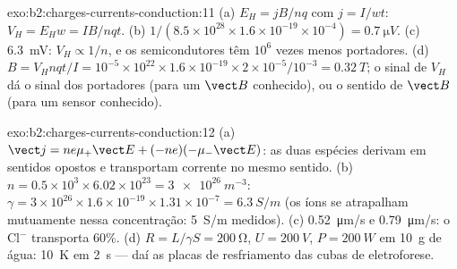 \begin{solution}{exo:b2:charges-currents-conduction:11}
(a) $E_H = jB/nq$ com $j = I/wt$: $V_H = E_Hw = IB/nqt$. (b) $1/(8.5 \times 10^{28}
\times 1.6 \times 10^{-19} \times 10^{-4}) = \qty{0.7}{\micro V}$. (c) \qty{6.3}{mV}: $V_H \propto 1/n$,
e os semicondutores têm $10^6$ vezes menos portadores. (d) $B = V_Hnqt/I =
10^{-5} \times 10^{22} \times 1.6 \times 10^{-19} \times 2 \times 10^{-5}/10^{-3} = \qty{0.32}{T}$; o sinal
de $V_H$ dá o sinal dos portadores (para um $\vect B$ conhecido), ou o
sentido de $\vect B$ (para um sensor conhecido).
\end{solution}

\begin{solution}{exo:b2:charges-currents-conduction:12}
(a) $\vect j = ne\mu_+\vect E + (-ne)(-\mu_-\vect E)$: as duas espécies derivam em
sentidos opostos e transportam corrente no mesmo sentido. (b) $n =
0.5 \times 10^3 \times 6.02 \times 10^{23} = \qty{3e26}{m^{-3}}$: $\gamma = 3 \times 10^{26} \times 1.6 \times 10^{-19}
\times 1.31 \times 10^{-7} = \qty{6.3}{S/m}$ (os íons se atrapalham mutuamente nessa
concentração: \qty{5}{S/m} medidos). (c) \qty{0.52}{\micro m/s} e \qty{0.79}{\micro m/s}:
o Cl$^-$ transporta $60\%$. (d) $R = L/\gamma S = \qty{200}{\ohm}$, $U = \qty{200}{V}$, $P =
\qty{200}{W}$ em \qty{10}{g} de água: \qty{10}{K} em \qty{2}{s} --- daí as placas
de resfriamento das cubas de eletroforese.
\end{solution}

